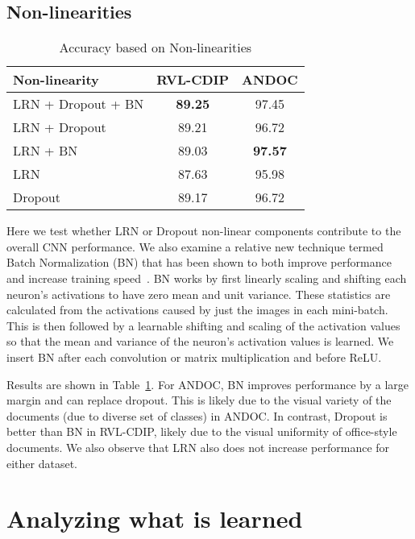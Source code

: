 \documentclass[10pt, conference, compsocconf]{IEEEtran}
\newcommand{\squeezeup}{\vspace{-2.5mm}}
\begin{document}
\subsection{Non-linearities}

\begin{table}
\centering
\begin{tabular}{l|c|c}

Non-linearity           & RVL-CDIP          & ANDOC    \\
\hline
LRN + Dropout + BN      &  \textbf{89.25}   & 97.45    \\
LRN + Dropout           &  89.21   & 96.72    \\
LRN + BN                &  89.03            & \textbf{97.57}    \\
LRN                     &  87.63            & 95.98    \\
Dropout                 &  89.17  & 96.72    \\
\end{tabular}

\caption{Accuracy based on Non-linearities}
\label{tab:nonlinear}
\squeezeup
\squeezeup
\squeezeup
\end{table}

Here we test whether LRN or Dropout non-linear components contribute to the overall CNN performance.
We also examine a relative new technique termed Batch Normalization (BN) that has been shown to both improve performance and increase training speed~\cite{ioffe15}.
BN works by first linearly scaling and shifting each neuron's activations to have zero mean and unit variance.
These statistics are calculated from the activations caused by just the images in each mini-batch.
This is then followed by a learnable shifting and scaling of the activation values so that the mean and variance of the neuron's activation values is learned.
We insert BN after each convolution or matrix multiplication and before ReLU.

Results are shown in Table~\ref{tab:nonlinear}.
For ANDOC, BN improves performance by a large margin and can replace dropout.
This is likely due to the visual variety of the documents (due to diverse set of classes) in ANDOC.
In contrast, Dropout is better than BN in RVL-CDIP, likely due to the visual uniformity of office-style documents.
We also observe that LRN also does not increase performance for either dataset.



\section{Analyzing what is learned}
\end{document}
